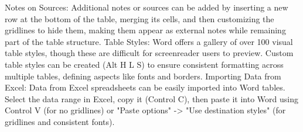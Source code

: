 Notes on Sources: Additional notes or sources can be added by inserting a new row at the bottom of the table, merging its cells, and then customizing the gridlines to hide them, making them appear as external notes while remaining part of the table structure.\supercite{kingsbury2025}
Table Styles: Word offers a gallery of over 100 visual table styles, though these are difficult for screenreader users to preview.\supercite{kingsbury2025} Custom table styles can be created (Alt H L S) to ensure consistent formatting across multiple tables, defining aspects like fonts and borders.\supercite{kingsbury2025}
Importing Data from Excel: Data from Excel spreadsheets can be easily imported into Word tables. Select the data range in Excel, copy it (Control C), then paste it into Word using Control V (for no gridlines) or "Paste options" -\textgreater{} "Use destination styles" (for gridlines and consistent fonts).\supercite{kingsbury2025}
